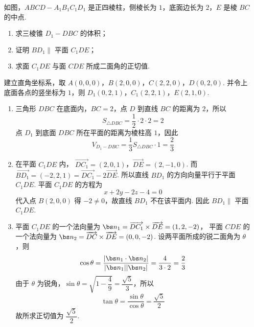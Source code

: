 \begin{problem}
如图，\(ABCD-A_1B_1C_1D_1\) 是正四棱柱，侧棱长为 \(1\)，底面边长为 \(2\)，\(E\) 是棱 \(BC\) 的中点.

\begin{enumerate}
\item 求三棱锥 \(D_1-DBC\) 的体积；
\item 证明 \(BD_1\parallel\) 平面 \(C_1DE\)；
\item 求面 \(C_1DE\) 与面 \(CDE\) 所成二面角的正切值.
\end{enumerate}


\begin{solution}
建立直角坐标系，取 \(A(0,0,0)\)，\(B(2,0,0)\)，\(C(2,2,0)\)，\(D(0,2,0)\). 并令上底面各点的竖坐标为 \(1\)，则 \(D_1(0,2,1)\)，\(C_1(2,2,1)\)，\(E(2,1,0)\).

\begin{enumerate}
\item 三角形 \(DBC\) 在底面内，\(BC=2\)，点 \(D\) 到直线 \(BC\) 的距离为 \(2\)，所以
\[
S_{\triangle DBC}=\frac12\cdot2\cdot2=2
\]
点 \(D_1\) 到底面 \(DBC\) 所在平面的距离为棱柱高 \(1\)，因此
\[
V_{D_1-DBC}=\frac13S_{\triangle DBC}\cdot1=\frac23
\]

\item 在平面 \(C_1DE\) 内，
\(\overrightarrow{DC_1}=(2,0,1)\)，\(\overrightarrow{DE}=(2,-1,0)\). 而 \(\overrightarrow{BD_1}=(-2,2,1)=\overrightarrow{DC_1}-2\overrightarrow{DE}\). 所以直线 \(BD_1\) 的方向向量平行于平面 \(C_1DE\). 平面 \(C_1DE\) 的方程为
\[
x+2y-2z-4=0
\]
代入点 \(B(2,0,0)\) 得 \(-2\neq0\)，故直线 \(BD_1\) 不在该平面内. 因此 \(BD_1\parallel\) 平面 \(C_1DE\).

\item 平面 \(C_1DE\) 的一个法向量为
\(\bs n_1=\overrightarrow{DC_1}\times\overrightarrow{DE}=(1,2,-2)\)，
平面 \(CDE\) 的一个法向量为
\(\bs n_2=\overrightarrow{DC}\times\overrightarrow{DE}=(0,0,-2)\).
设两平面所成的锐二面角为 \(\theta\)，则
\[
\cos\theta=\frac{|\bs n_1\cdot\bs n_2|}{|\bs n_1||\bs n_2|}=\frac{4}{3\cdot2}=\frac23
\]
由于 \(\theta\) 为锐角，\(\sin\theta=\sqrt{1-\dfrac49}=\dfrac{\sqrt5}{3}\)，所以
\[
\tan\theta=\frac{\sin\theta}{\cos\theta}=\frac{\sqrt5}{2}
\]
故所求正切值为 \(\dfrac{\sqrt5}{2}\).
\end{enumerate}
\end{solution}
\end{problem}

